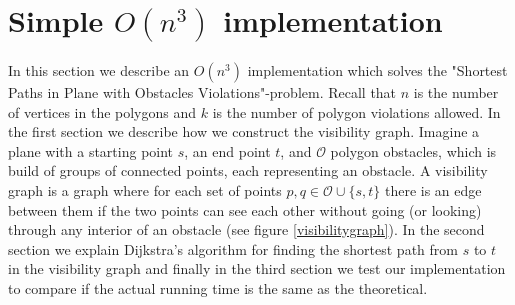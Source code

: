 \chapter{Simple $O(n^3)$ implementation}
In this section we describe an $O(n^3)$ implementation which solves the
"Shortest Paths in Plane with Obstacles Violations"-problem. Recall that $n$ is
the number of vertices in the polygons and $k$ is the number of polygon
violations allowed. In the first section we describe how we construct the
visibility graph. Imagine a plane with a starting point $s$, an end point $t$,
and $\mathcal{O}$ polygon obstacles, which is build of groups of connected points,
each representing an obstacle. A visibility graph is a graph where for each set of
points $p,q\in \mathcal{O} \cup \{s,t\}$  there is an edge between them if the 
two points can see each other
without going (or looking) through any interior of an obstacle (see figure
\ref{visibilitygraph}). In the second section we explain Dijkstra's algorithm
for finding the shortest path from $s$ to $t$ in the visibility graph and
finally in the third section we test our implementation to compare if the actual 
running time is the same as the theoretical.


